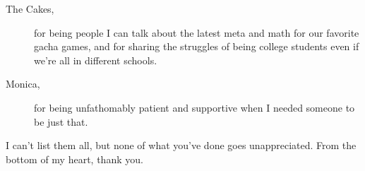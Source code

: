 \begin{description}
    \item[The Cakes,] for being people I can talk about the latest meta and math for our favorite gacha games, and for sharing the struggles of being college students even if we're all in different schools.
    \item[Monica,] for being unfathomably patient and supportive when I needed someone to be just that.
\end{description}

I can't list them all, but none of what you've done goes unappreciated. From the bottom of my heart, thank you.
